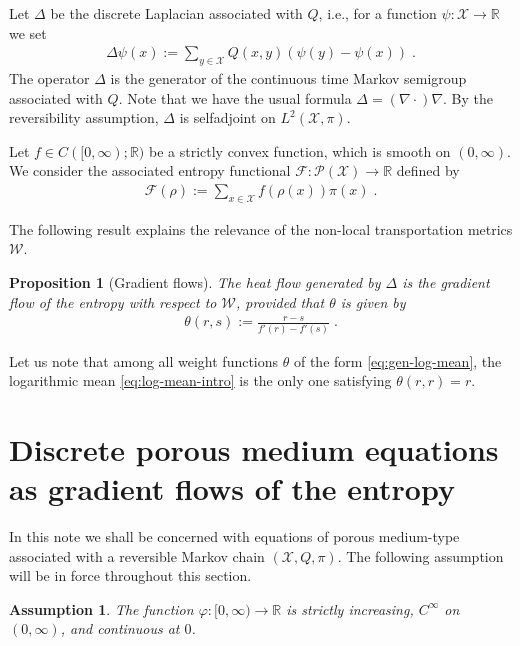 \documentclass[a4paper,11pt,reqno]{amsart}
\theoremstyle{plain}
\newtheorem{proposition}[theorem]{Proposition}
\newtheorem{assumption}[theorem]{Assumption}
\theoremstyle{remark}
\numberwithin{equation}{section}
\begin{document}
Let $\Delta$ be the discrete Laplacian associated with $Q$, i.e., for
a function $\psi : {\mathcal{X}} \to {{\mathbb R}}$ we set
\begin{align}\label{eq:Laplace}
 \Delta \psi(x) :=  \sum_{y \in {\mathcal{X}}} Q(x,y) (\psi(y) - \psi(x))\;.
\end{align}
The operator $\Delta$ is the generator of the continuous time Markov
semigroup associated with $Q$. Note that we have the usual formula
$\Delta = (\nabla \cdot) \nabla$.  By the reversibility assumption,
$\Delta$ is selfadjoint on $L^2({\mathcal{X}},\pi)$.

 Let $f \in C([0,\infty);{{\mathbb R}})$ be a strictly convex function, which is
 smooth on $(0,\infty)$. We consider the associated entropy functional
 ${\mathcal{F}} : {{\mathscr{P}}({\mathcal{X}})} \to {{\mathbb R}}$ defined by
\begin{align*}
 {\mathcal{F}}(\rho) := \sum_{x \in {\mathcal{X}}} f(\rho(x))\pi(x)\;.
\end{align*}

The following result explains the relevance of the non-local
transportation metrics ${\mathcal{W}}$.

\begin{proposition}[Gradient flows]\label{prop:grad-flow}
  The heat flow generated by $\Delta$ is the gradient flow of the
  entropy with respect to ${\mathcal{W}}$, provided that $\theta$ is given by
\begin{align}\label{eq:gen-log-mean}
 \theta(r,s) := \frac{r -  s}{f'(r) - f'(s)}\;.
\end{align}
\end{proposition}
Let us note that among all weight functions $\theta$
of the form \eqref{eq:gen-log-mean}, the logarithmic mean
\eqref{eq:log-mean-intro} is the only one satisfying $\theta(r,r) =
r$.

\section{Discrete porous medium equations as gradient flows of the entropy}

In this note we shall be concerned with equations of porous
medium-type associated with a reversible Markov chain $({\mathcal{X}}, Q,
\pi)$.
The following assumption will be in force throughout this section.

\begin{assumption}\label{ass:phi}
The function ${\varphi} : [0,\infty) \to {{\mathbb R}}$ is strictly increasing,
  $C^\infty$ on $(0,\infty)$, and continuous at $0$.
\end{assumption}
\end{document}

